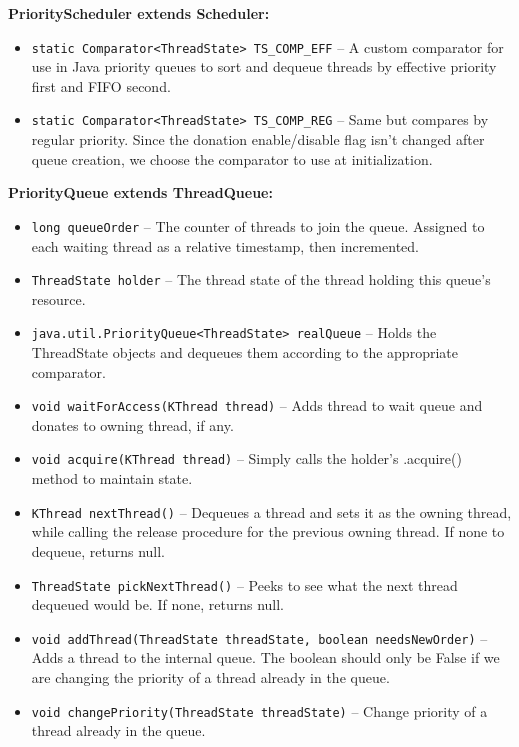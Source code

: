 \documentclass{article}
\begin{document}
\textbf{PriorityScheduler extends Scheduler:} \begin{itemize}
\item \texttt{\textcolor{\changecolor}{static Comparator<ThreadState> TS\_COMP\_EFF}} -- A custom comparator for use in Java priority queues to sort and dequeue threads by effective priority first and FIFO second.
\item \texttt{\textcolor{\changecolor}{static Comparator<ThreadState> TS\_COMP\_REG}} -- Same but compares by regular priority. Since the donation enable/disable flag isn't changed after queue creation, we choose the comparator to use at initialization.
\end{itemize}

\noindent\textbf{PriorityQueue extends ThreadQueue:} \begin{itemize}
\item \texttt{\textcolor{\changecolor}{long queueOrder}} -- The counter of threads to join the queue. Assigned to each waiting thread as a relative timestamp, then incremented.
\item \texttt{ThreadState holder} -- The thread state of the thread holding this queue's resource.
\item \texttt{\textcolor{\changecolor}{java.util.PriorityQueue<ThreadState> realQueue}} -- Holds the ThreadState objects and dequeues them according to the appropriate comparator.
\item \texttt{void waitForAccess(KThread thread)} -- Adds thread to wait queue and donates to owning thread, if any.
\item \texttt{void acquire(KThread thread)} -- Simply calls the holder's .acquire() method to maintain state.
\item \texttt{KThread nextThread()} -- Dequeues a thread and sets it as the owning thread, while calling the release procedure for the previous owning thread. If none to dequeue, returns null.
\item \texttt{ThreadState pickNextThread()} -- Peeks to see what the next thread dequeued would be. If none, returns null.
\item \texttt{void addThread(ThreadState threadState, boolean needsNewOrder)} -- Adds a thread to the internal queue. The boolean should only be False if we are changing the priority of a thread already in the queue.
\item \texttt{void changePriority(ThreadState threadState)} -- Change priority of a thread already in the queue.
\end{itemize}
\end{document}
